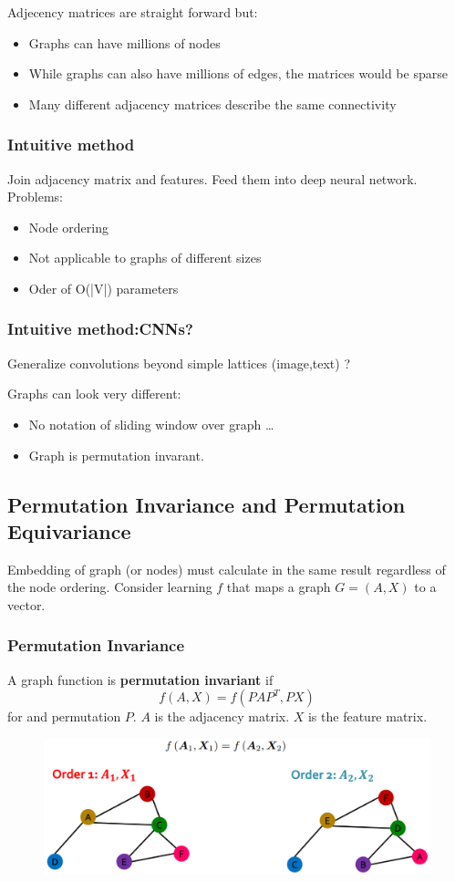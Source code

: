 Adjecency matrices are straight forward but:
\begin{itemize}
    \item Graphs can have millions of nodes
    \item While graphs can also have millions of edges, the matrices would be sparse
    \item Many different adjacency matrices describe the same connectivity
\end{itemize}
\subsubsection{Intuitive method}
Join adjacency matrix and features.
Feed them into deep neural network.
Problems:
\begin{itemize}
    \item Node ordering
    \item Not applicable to graphs of different sizes
    \item Oder of O(|V|) parameters 
\end{itemize}
\subsubsection{Intuitive method:CNNs?}
Generalize convolutions beyond simple lattices (image,text) ?

Graphs can look very different:
\begin{itemize}
    \item No notation of sliding window over graph \dots
    \item Graph is permutation invarant.
\end{itemize}
\subsection{Permutation Invariance and Permutation Equivariance}
Embedding of graph (or nodes) must calculate in the same result regardless of the node ordering.
Consider learning \(f\) that maps a graph \(G = (A,X)\) to a vector.
\subsubsection*{Permutation Invariance}
A graph function is \textbf{permutation invariant} if
\[
f(A,X) = f(PAP^T,PX)
\]
for and permutation \(P\).
\(A\) is the adjacency matrix.
\(X\) is the feature matrix.
\begin{figure}[!h]
    \includegraphics[width = \columnwidth]{figures/GraphNeuralNetworks1/PermutationInvariance.png}
\end{figure}

